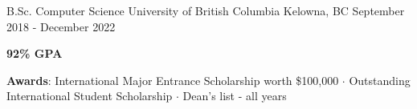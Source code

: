 

\begin{cventries}


	\cventry
	{B.Sc. Computer Science} %
	{University of British Columbia} %
	{Kelowna, BC} %
	{September 2018 - December 2022} %
	{
		\begin{cvitems} %
			\item {\textbf{92\% GPA}}
			\item {\textbf{Awards}: International Major Entrance Scholarship worth \$100,000 $\cdot$ Outstanding International Student Scholarship $\cdot$ Dean's list - all years}
		\end{cvitems}
	}

\end{cventries}



